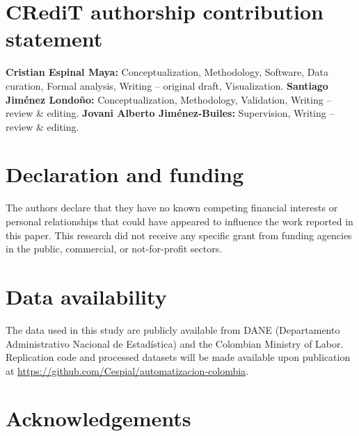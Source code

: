 \documentclass[5p,times,authoryear]{elsarticle}
\begin{document}
\FloatBarrier


\section*{CRediT authorship contribution statement}

\textbf{Cristian Espinal Maya:} Conceptualization, Methodology, Software, Data curation, Formal analysis, Writing -- original draft, Visualization.
\textbf{Santiago Jim\'enez Londo\~no:} Conceptualization, Methodology, Validation, Writing -- review \& editing.
\textbf{Jovani Alberto Jim\'enez-Builes:} Supervision, Writing -- review \& editing.

\section*{Declaration and funding}

The authors declare that they have no known competing financial interests or personal relationships that could have appeared to influence the work reported in this paper. This research did not receive any specific grant from funding agencies in the public, commercial, or not-for-profit sectors.

\section*{Data availability}

The data used in this study are publicly available from DANE (Departamento Administrativo Nacional de Estad\'istica) and the Colombian Ministry of Labor. Replication code and processed datasets will be made available upon publication at \url{https://github.com/Cespial/automatizacion-colombia}.

\section*{Acknowledgements}
\end{document}
